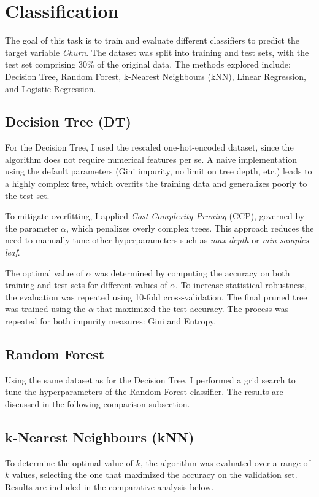 \documentclass[a4paper,11pt]{article}
\begin{document}
\section{Classification}
The goal of this task is to train and evaluate different classifiers to predict the target variable \textit{Churn}. The dataset was split into training and test sets, with the test set comprising 30\% of the original data. The methods explored include: Decision Tree, Random Forest, k-Nearest Neighbours (kNN), Linear Regression, and Logistic Regression.

\subsection{Decision Tree (DT)}
For the Decision Tree, I used the rescaled one-hot-encoded dataset, since the algorithm does not require numerical features per se. A naive implementation using the default parameters (Gini impurity, no limit on tree depth, etc.) leads to a highly complex tree, which overfits the training data and generalizes poorly to the test set.

To mitigate overfitting, I applied \textit{Cost Complexity Pruning} (CCP), governed by the parameter $\alpha$, which penalizes overly complex trees. This approach reduces the need to manually tune other hyperparameters such as \textit{max depth} or \textit{min samples leaf}.

The optimal value of $\alpha$ was determined by computing the accuracy on both training and test sets for different values of $\alpha$. To increase statistical robustness, the evaluation was repeated using 10-fold cross-validation. The final pruned tree was trained using the $\alpha$ that maximized the test accuracy. The process was repeated for both impurity measures: Gini and Entropy.

\subsection{Random Forest}
Using the same dataset as for the Decision Tree, I performed a grid search to tune the hyperparameters of the Random Forest classifier. The results are discussed in the following comparison subsection.

\subsection{k-Nearest Neighbours (kNN)}
To determine the optimal value of $k$, the algorithm was evaluated over a range of $k$ values, selecting the one that maximized the accuracy on the validation set. Results are included in the comparative analysis below.
\end{document}
